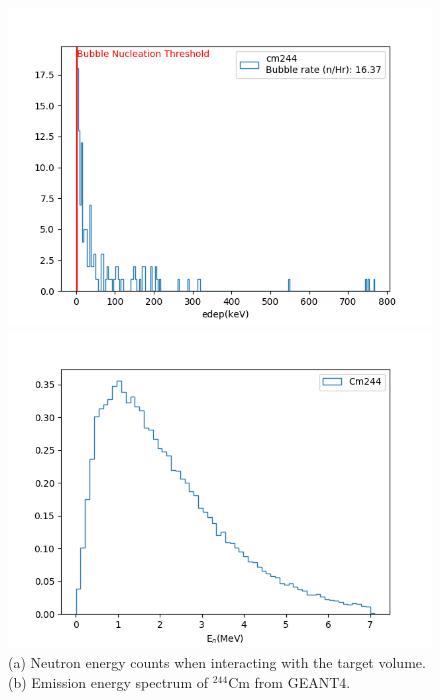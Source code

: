 \documentclass[%
12pt,
twoside,
reprint,
amsmath,amssymb,
aps,
]{article}
\begin{document}
	\pagebreak
	\begin{figure}[!t]
		\begin{minipage}{0.5\textwidth}
			\centering
			\includegraphics[width=1.02\linewidth]{Images/cm244.png}
		\end{minipage}
		\begin{minipage}{0.5\textwidth}
			\centering
			\includegraphics[width=1.02\linewidth]{Images/cm244_spectrum.png}
		\end{minipage}
		\caption{\label{tab:table-name} (a) Neutron energy counts when interacting with the target volume. (b) Emission energy spectrum of $^{244}$Cm from GEANT4.}%
	\end{figure}
\end{document}
